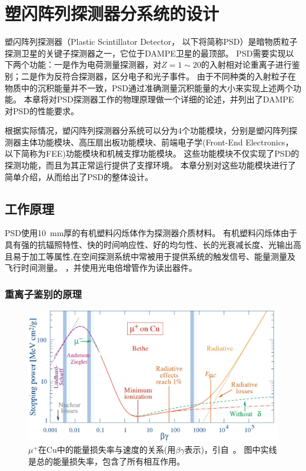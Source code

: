 \chapter{塑闪阵列探测器分系统的设计}
塑闪阵列探测器（Plastic Scintillator Detector， 以下将简称PSD）是暗物质粒子探测卫星的关键子探测器之一，它位于DAMPE卫星的最顶部。
PSD需要实现以下两个功能：一是作为电荷测量探测器，对$Z=1\sim20$的入射相对论重离子进行鉴别；二是作为反符合探测器，区分电子和光子事件。
由于不同种类的入射粒子在物质中的沉积能量并不一致，PSD通过准确测量沉积能量的大小来实现上述两个功能。
本章将对PSD探测器工作的物理原理做一个详细的论述，并列出了DAMPE对PSD的性能要求。

根据实际情况，塑闪阵列探测器分系统可以分为4个功能模块，分别是塑闪阵列探测器主体功能模块、高压扇出板功能模块、前端电子学(Front-End Electronics，以下简称为FEE)功能模块和机械支撑功能模块。
这些功能模块不仅实现了PSD的探测功能，而且为其正常运行提供了支撑环境。
本章分别对这些功能模块进行了简单介绍，从而给出了PSD的整体设计。

\section{工作原理}
\label{sec:psd_principle}
PSD使用\SI{10}{\milli\meter}厚的有机塑料闪烁体作为探测器介质材料。
有机塑料闪烁体由于具有强的抗辐照特性、快的时间响应性、好的均匀性、长的光衰减长度、光输出高且易于加工等属性,在空间探测系统中常被用于提供系统的触发信号、能量测量及飞行时间测量。
，并使用光电倍增管作为读出器件。

\subsection{重离子鉴别的原理}
\begin{figure}[h!]
	\centering
	\includegraphics[width=0.8\linewidth]{chap/description/fig/energyloss_vs_velocity}
	\caption{${\mu}^+$在Cu中的能量损失率与速度的关系(用$\beta\gamma$表示)，引自~\parencite{pdg_book}。 图中实线是总的能量损失率，包含了所有相互作用。}
	\label{fig:ch2:energyloss_vs_velocity}
\end{figure}

